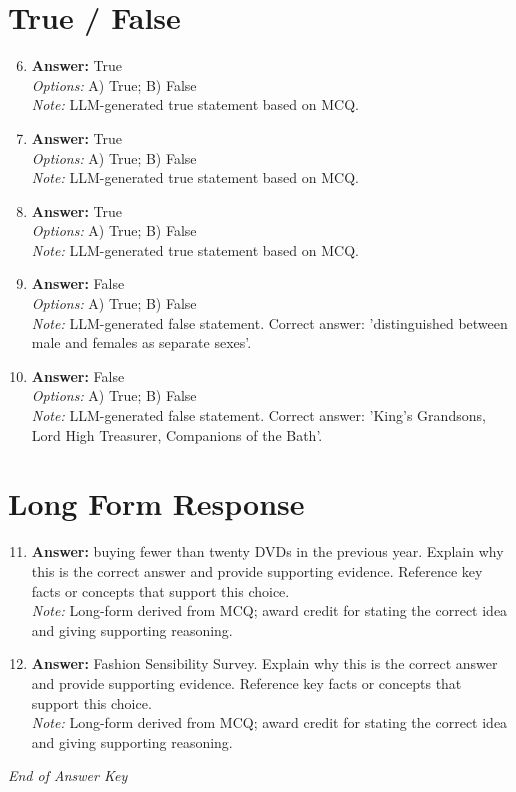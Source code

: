 \documentclass[12pt]{article}
\begin{document}
\section*{True / False}
\begin{enumerate}[label=\arabic*.]
\setcounter{enumi}{5}
\item \textbf{Answer:} True
\\ \textit{Options:} A) True; B) False
\\ \textit{Note:} LLM-generated true statement based on MCQ.
\item \textbf{Answer:} True
\\ \textit{Options:} A) True; B) False
\\ \textit{Note:} LLM-generated true statement based on MCQ.
\item \textbf{Answer:} True
\\ \textit{Options:} A) True; B) False
\\ \textit{Note:} LLM-generated true statement based on MCQ.
\item \textbf{Answer:} False
\\ \textit{Options:} A) True; B) False
\\ \textit{Note:} LLM-generated false statement. Correct answer: 'distinguished between male and females as separate sexes'.
\item \textbf{Answer:} False
\\ \textit{Options:} A) True; B) False
\\ \textit{Note:} LLM-generated false statement. Correct answer: 'King's Grandsons, Lord High Treasurer, Companions of the Bath'.
\end{enumerate}

\section*{Long Form Response}
\begin{enumerate}[label=\arabic*.]
\setcounter{enumi}{10}
\item \textbf{Answer:} buying fewer than twenty DVDs in the previous year. Explain why this is the correct answer and provide supporting evidence. Reference key facts or concepts that support this choice.
\\ \textit{Note:} Long-form derived from MCQ; award credit for stating the correct idea and giving supporting reasoning.
\item \textbf{Answer:} Fashion Sensibility Survey. Explain why this is the correct answer and provide supporting evidence. Reference key facts or concepts that support this choice.
\\ \textit{Note:} Long-form derived from MCQ; award credit for stating the correct idea and giving supporting reasoning.
\end{enumerate}

\vfill
\noindent\textit{End of Answer Key}
\end{document}
